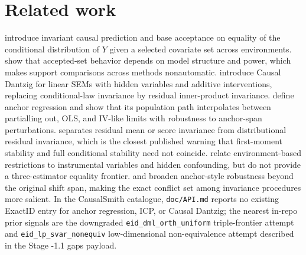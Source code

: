\documentclass[11pt]{article}
\theoremstyle{definition}
\theoremstyle{plain}
\theoremstyle{remark}
\begin{document}
\section{Related work}
\citet{PetersBuhlmannMeinshausen2016ICP} introduce invariant causal prediction and base acceptance on equality of the conditional distribution of $Y$ given a selected covariate set across environments. \citet{HeinzeDemlPetersMeinshausen2018NonlinearICP} show that accepted-set behavior depends on model structure and power, which makes support comparisons across methods nonautomatic. \citet{RothenhauslerBuhlmannMeinshausen2019CausalDantzig} introduce Causal Dantzig for linear SEMs with hidden variables and additive interventions, replacing conditional-law invariance by residual inner-product invariance. \citet{RothenhauslerMeinshausenBuhlmannPeters2021Anchor} define anchor regression and show that its population path interpolates between partialling out, OLS, and IV-like limits with robustness to anchor-span perturbations. \citet{KookSickBuhlmann2022DistributionalAnchor} separates residual mean or score invariance from distributional residual invariance, which is the closest published warning that first-moment stability and full conditional stability need not coincide. \citet{LongZhuDoHa2023IVEnvironments} relate environment-based restrictions to instrumental variables and hidden confounding, but do not provide a three-estimator equality frontier. \citet{HenziShenLawBuhlmann2025IPP} and \citet{ShenBuhlmannTaeb2026Robustness} broaden anchor-style robustness beyond the original shift span, making the exact conflict set among invariance procedures more salient. In the CausalSmith catalogue, \texttt{doc/API.md} reports no existing ExactID entry for anchor regression, ICP, or Causal Dantzig; the nearest in-repo prior signals are the downgraded \texttt{eid\_dml\_orth\_uniform} triple-frontier attempt and \texttt{eid\_lp\_svar\_nonequiv} low-dimensional non-equivalence attempt described in the Stage -1.1 gaps payload.
\end{document}
